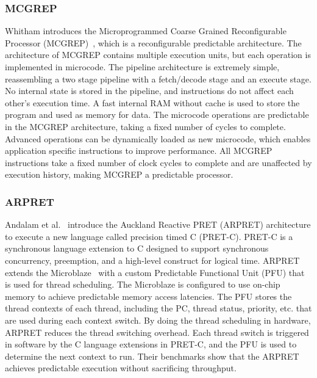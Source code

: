 \subsubsection{MCGREP}
Whitham introduces the Microprogrammed Coarse Grained Reconfigurable Processor (MCGREP)~\cite{whitam:06:mcgrep}, which is a reconfigurable predictable architecture.
The architecture of MCGREP contains multiple execution units, but each operation is implemented in microcode. 
The pipeline architecture is extremely simple, reassembling a two stage pipeline with a fetch/decode stage and an execute stage.
No internal state is stored in the pipeline, and instructions do not affect each other's execution time. 
A fast internal RAM without cache is used to store the program and used as memory for data.    
The microcode operations are predictable in the MCGREP architecture, taking a fixed number of cycles to complete.
Advanced operations can be dynamically loaded as new microcode, which enables application specific instructions to improve performance.
All MCGREP instructions take a fixed number of clock cycles to complete and are unaffected by execution history, making MCGREP a predictable processor. 

\subsubsection{ARPRET}
Andalam et al.~\cite{pretc} introduce the Auckland Reactive PRET (ARPRET) architecture to execute a new language called precision timed C (PRET-C).
PRET-C is a synchronous language extension to C designed to support synchronous concurrency, preemption, and a high-level construct for logical time.
ARPRET extends the Microblaze~\cite{xilinx-microblaze} with a custom Predictable Functional Unit (PFU) that is used for thread scheduling.
The Microblaze is configured to use on-chip memory to achieve predictable memory access latencies. 
The PFU stores the thread contexts of each thread, including the PC, thread status, priority, etc. that are used during each context switch.
By doing the thread scheduling in hardware, ARPRET reduces the thread switching overhead. 
Each thread switch is triggered in software by the C language extensions in PRET-C, and the PFU is used to determine the next context to run.   
Their benchmarks show that the ARPRET achieves predictable execution without sacrificing throughput. 

